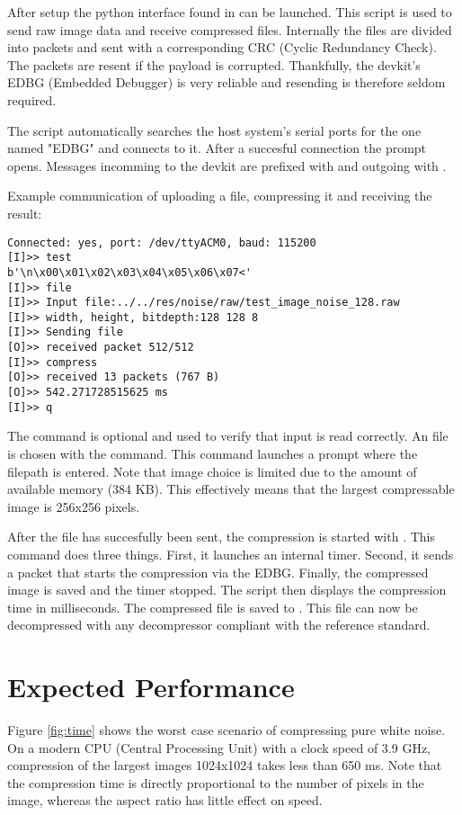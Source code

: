 \documentclass[12pt, a4paper]{article}
\begin{document}
\newpage
\noindent
After setup the python interface found in   can be launched. 
This script is used to send raw image data and receive compressed files. 
Internally the files are divided into packets and sent with a corresponding CRC (Cyclic Redundancy Check).
The packets are resent if the payload is corrupted. 
Thankfully, the devkit's EDBG (Embedded Debugger) is very reliable and resending is therefore seldom required.

\medskip
\noindent
The script automatically searches the host system's serial ports for the one named "EDBG" and connects to it. 
After a succesful connection the prompt opens. 
Messages incomming to the devkit are prefixed with \code{[I]} and outgoing with \code{[O]}.

\medskip
\noindent
Example communication of uploading a file, compressing it and receiving the result:

\bigskip
\begin{minipage}{\textwidth}
\begin{verbatim}
Connected: yes, port: /dev/ttyACM0, baud: 115200
[I]>> test
b'\n\x00\x01\x02\x03\x04\x05\x06\x07<'
[I]>> file
[I]>> Input file:../../res/noise/raw/test_image_noise_128.raw
[I]>> width, height, bitdepth:128 128 8
[I]>> Sending file
[O]>> received packet 512/512
[I]>> compress
[O]>> received 13 packets (767 B)
[O]>> 542.271728515625 ms
[I]>> q
\end{verbatim}
\end{minipage}

\bigskip
\noindent
The  command is optional and used to verify that input is read correctly. 
An file is chosen with the  command. 
This command launches a prompt where the filepath is entered. 
Note that image choice is limited due to the amount of available memory (384 KB). 
This effectively means that the largest compressable image is 256x256 pixels. 

\medskip
\noindent
After the file has succesfully been sent, the compression is started with . 
This command does three things. 
First, it launches an internal timer. 
Second, it sends a packet that starts the compression via the EDBG. 
Finally, the compressed image is saved and the timer stopped. 
The script then displays the compression time in milliseconds. 
The compressed file is saved to . 
This file can now be decompressed with any decompressor compliant with the reference standard.

\newpage
\section{Expected Performance}
Figure \ref{fig:time} shows the worst case scenario of compressing pure white noise.
On a modern CPU (Central Processing Unit) with a clock speed of 3.9 GHz, 
compression of the largest images 1024x1024 takes less than 650 ms. 
Note that the compression time is directly proportional to the number of pixels in the image, 
whereas the aspect ratio has little effect on speed.
\end{document}

